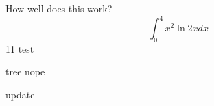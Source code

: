 \documentclass{article}
\begin{document}
How well does this work?
$$\int_0^4 x^2 \ln{2x}dx$$
11  test

tree nope


update
\end{document}
